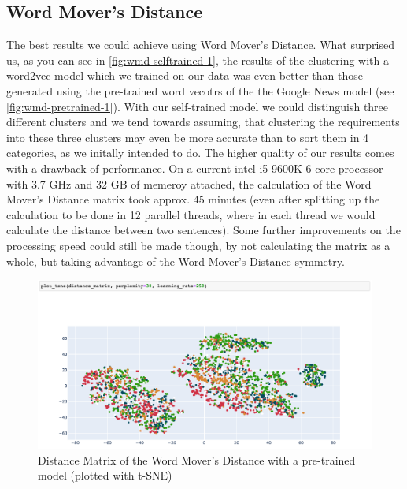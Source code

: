 \subsection{Word Mover's Distance} %
\label{sub:findings_wmd}
The best results we could achieve using Word Mover's Distance. What surprised us, as you can see in \autoref{fig:wmd-selftrained-1}, the results of the clustering with a word2vec model which we trained on our data was even better than those generated using the pre-trained word vecotrs of the the Google News model (see \autoref{fig:wmd-pretrained-1}). With our self-trained model we could distinguish three different clusters and we tend towards assuming, that clustering the requirements into these three clusters may even be more accurate than to sort them in 4 categories, as we initally intended to do.
The higher quality of our results comes with a drawback of performance. On a current intel i5-9600K 6-core processor with 3.7 GHz and 32 GB of memeroy attached, the calculation of the Word Mover's Distance matrix took approx. 45 minutes (even after splitting up the calculation to be done in 12 parallel threads, where in each thread we would calculate the distance between two sentences). Some further improvements on the processing speed could still be made though, by not calculating the matrix as a whole, but taking advantage of the Word Mover's Distance symmetry.

\begin{figure}[ht]
  \begin{center}
    \includegraphics[width=\textwidth]{screenshots/pt_word_movers_distance_tsne1.png}
    \caption{Distance Matrix of the Word Mover's Distance with a pre-trained model (plotted with t-SNE)}
    \label{fig:wmd-pretrained-1}
  \end{center}
\end{figure}


